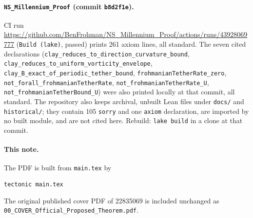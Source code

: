 \documentclass[11pt]{article}
\theoremstyle{plain}
\theoremstyle{definition}
\theoremstyle{remark}
\newcommand{\nssha}{b8d2f1e}
\begin{document}
\paragraph{\texttt{NS\_Millennium\_Proof} (commit \texttt{\nssha}).}
CI run \url{https://github.com/BenFrohman/NS\_Millennium\_Proof/actions/runs/43928069777} (\texttt{Build (lake)}, passed) prints 261 axiom lines, all standard. The seven cited declarations (\texttt{clay\_\hspace{0pt}reduces\_\hspace{0pt}to\_\hspace{0pt}direction\_\hspace{0pt}curvature\_\hspace{0pt}bound}, \texttt{clay\_\hspace{0pt}reduces\_\hspace{0pt}to\_\hspace{0pt}uniform\_\hspace{0pt}vorticity\_\hspace{0pt}envelope}, \texttt{clay\_\hspace{0pt}B\_\hspace{0pt}exact\_\hspace{0pt}of\_\hspace{0pt}periodic\_\hspace{0pt}tether\_\hspace{0pt}bound}, \texttt{frohmanianTetherRate\_\hspace{0pt}zero}, \texttt{not\_\hspace{0pt}forall\_\hspace{0pt}frohmanianTetherRate}, \texttt{not\_\hspace{0pt}frohmanianTetherRate\_\hspace{0pt}U}, \texttt{not\_\hspace{0pt}frohmanianTetherBound\_\hspace{0pt}U}) were also printed locally at that commit, all standard. The repository also keeps archival, unbuilt Lean files under \texttt{docs/} and \texttt{historical/}; they contain 105 \texttt{sorry} and one \texttt{axiom} declaration, are imported by no built module, and are not cited here. Rebuild: \texttt{lake build} in a clone at that commit.

\paragraph{This note.}
The PDF is built from \texttt{main.tex} by
\begin{lstlisting}
tectonic main.tex
\end{lstlisting}
The original published cover PDF of 22835069 is included unchanged as \texttt{00\_\hspace{0pt}COVER\_\hspace{0pt}Official\_\hspace{0pt}Proposed\_\hspace{0pt}Theorem.\hspace{0pt}pdf}.
\end{document}

